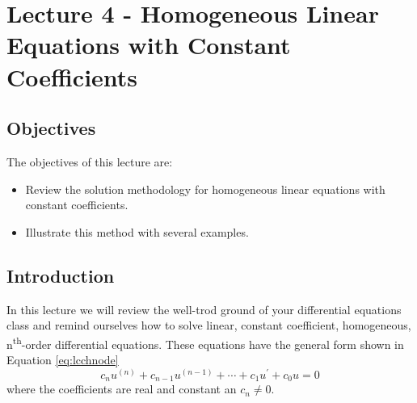 \chapter{Lecture 4 - Homogeneous Linear Equations with Constant Coefficients}
\label{ch:lec4}
\section{Objectives}
The objectives of this lecture are:
\begin{itemize}
\item Review the solution methodology for homogeneous linear equations with constant coefficients.
\item Illustrate this method with several examples.
\end{itemize}
\section{Introduction}
In this lecture we will review the well-trod ground of your differential equations class and remind ourselves how to solve linear, constant coefficient, homogeneous, n\textsuperscript{th}-order differential equations.  These equations have the general form shown in Equation \ref{eq:lcchnode}
\begin{equation}
c_nu^{(n)}+c_{n-1}u^{(n-1)}+\cdots+c_1u^{\prime}+c_0u=0
\label{eq:lcchnode}
\end{equation}
\noindent where the coefficients are real and constant an $c_n \ne 0$.


